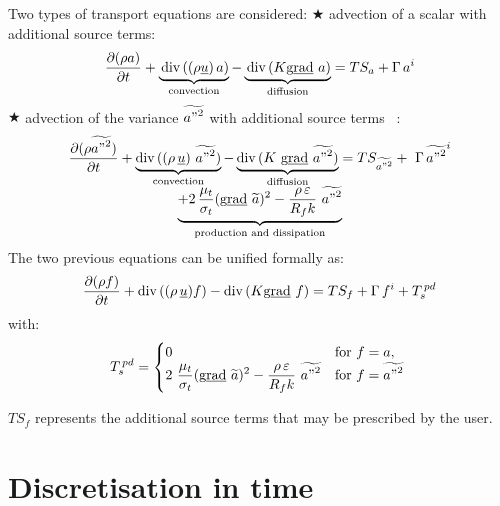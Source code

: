 Two types of transport equations are considered: \newline
{\tiny $\bigstar $} advection of a scalar with additional source terms:
\begin{equation}
\frac{\partial (\rho a)}{\partial t}+\underbrace{\,\dive\,((\rho \underline{u%
})\,a)}_{\text{convection}}-\underbrace{\,\dive\,(K\grad a)}_{\text{diffusion%
}}=TS_{a}+\Gamma \,a^{i}
\end{equation}%
{\tiny $\bigstar $} advection of the variance $\widetilde{{a"}^{2}}$ with
additional source terms ~:
\begin{equation}
\begin{array}{lcl}
& \displaystyle\frac{\partial (\rho \widetilde{{a"}^{2}})}{\partial t}+%
\underbrace{\dive\,((\rho \,\underline{u})\ \widetilde{{a"}^{2}})}_{\text{%
convection}}-\underbrace{\dive\,(K\ \grad\widetilde{{a"}^{2}})}_{\text{%
diffusion}}=TS_{\widetilde{{a"}^{2}}}+\ \Gamma \,\widetilde{{a"}^{2}}^{i} &
\\
& \displaystyle\underbrace{+2\,\frac{\mu _{t}}{\sigma _{t}}(\grad\widetilde{a%
})^{2}-\frac{\rho \,\varepsilon }{R_{f}k}\ \widetilde{{a"}^{2}}}_{\text{%
production and dissipation}} &
\end{array}%
\end{equation}%
The two previous equations can be unified formally as:
\begin{equation}
\frac{\partial (\rho f)}{\partial t}+\dive\,((\rho \,\underline{u})f)-\dive%
\,(K\grad f)=TS_{f}+\Gamma \,f^{i}+T_{s}^{\,pd}  \label{Base_Introd_depart}
\end{equation}%
with:
\begin{equation}
\begin{array}{lll}
& \displaystyle T_{s}^{\,pd}=\begin{cases} 0 & \text{for $f=a$}, \\ 2\
\displaystyle \frac{\mu_t}{\sigma_t}(\grad \widetilde{a})^2 - \displaystyle
\frac{\rho\,\varepsilon}{R_f k}\ \widetilde{{a"}^2} & \text{for
$f=\widetilde{{a"}^2}$ } \end{cases} &
\end{array}%
\end{equation}

$TS_f$ represents the additional source terms that may be prescribed by the
user.

\newpage %

\section{Discretisation in time}

